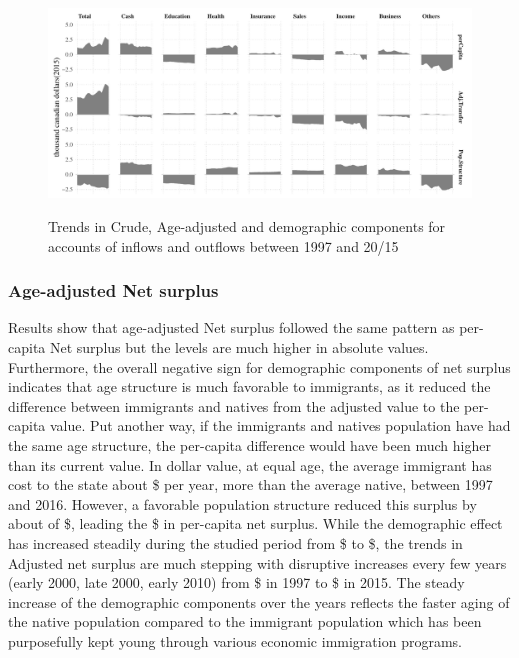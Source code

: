 \begin{figure}[H]%
  \caption{Trends in Crude, Age-adjusted and demographic components for accounts of inflows and outflows between 1997 and 20/15 }
  \includegraphics[width=1\textwidth]{res/DEcomp.pdf}%
  \label{fig:DEcomp}%
\end{figure}%

\subsubsection*{Age-adjusted Net surplus}

Results show that age-adjusted Net surplus followed the same pattern as per-capita Net surplus but the levels are much higher in absolute values.
Furthermore, the overall negative sign for demographic components of net surplus indicates that age structure is much favorable to immigrants, as it reduced the difference between immigrants and natives from the adjusted value to the per-capita value.
Put another way, if the immigrants and natives population have had the same age structure, the per-capita difference would have been much higher than its current value.
In dollar value, at equal age, the average immigrant has cost to the state about \$ per year, more than the average native, between 1997 and 2016.
However, a favorable population structure reduced this surplus by about of \$, leading the  \$ in per-capita net surplus.
While the demographic effect has increased steadily during the studied period from \$ to \$, the trends in Adjusted net surplus are much stepping with disruptive increases every few years (early 2000, late 2000, early 2010) from \$ in 1997 to \$ in 2015.
The steady increase of the demographic components over the years reflects the faster aging of the native population compared to the immigrant population which has been purposefully kept young through various economic immigration programs.

